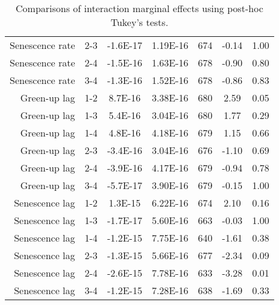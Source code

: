 \begin{table}[H]
\begin{tabular}{rcccccc}
  Senescence rate & 2-3 & -1.6E-17 & 1.19E-16 & 674 & -0.14 & 1.00 \\ 
  Senescence rate & 2-4 & -1.5E-16 & 1.63E-16 & 678 & -0.90 & 0.80 \\ 
  Senescence rate & 3-4 & -1.3E-16 & 1.52E-16 & 678 & -0.86 & 0.83 \\ 
  Green-up lag & 1-2 & 8.7E-16 & 3.38E-16 & 680 & 2.59 & 0.05 \\ 
  Green-up lag & 1-3 & 5.4E-16 & 3.04E-16 & 680 & 1.77 & 0.29 \\ 
  Green-up lag & 1-4 & 4.8E-16 & 4.18E-16 & 679 & 1.15 & 0.66 \\ 
  Green-up lag & 2-3 & -3.4E-16 & 3.04E-16 & 676 & -1.10 & 0.69 \\ 
  Green-up lag & 2-4 & -3.9E-16 & 4.17E-16 & 679 & -0.94 & 0.78 \\ 
  Green-up lag & 3-4 & -5.7E-17 & 3.90E-16 & 679 & -0.15 & 1.00 \\ 
  Senescence lag & 1-2 & 1.3E-15 & 6.22E-16 & 674 & 2.10 & 0.16 \\ 
  Senescence lag & 1-3 & -1.7E-17 & 5.60E-16 & 663 & -0.03 & 1.00 \\ 
  Senescence lag & 1-4 & -1.2E-15 & 7.75E-16 & 640 & -1.61 & 0.38 \\ 
  Senescence lag & 2-3 & -1.3E-15 & 5.66E-16 & 677 & -2.34 & 0.09 \\ 
  Senescence lag & 2-4 & -2.6E-15 & 7.78E-16 & 633 & -3.28 & 0.01 \\ 
  Senescence lag & 3-4 & -1.2E-15 & 7.28E-16 & 638 & -1.69 & 0.33 \\ 
  \end{tabular}
\caption{Comparisons of interaction marginal effects using post-hoc Tukey's tests.} 
\label{lsq_terms}
\end{table}

